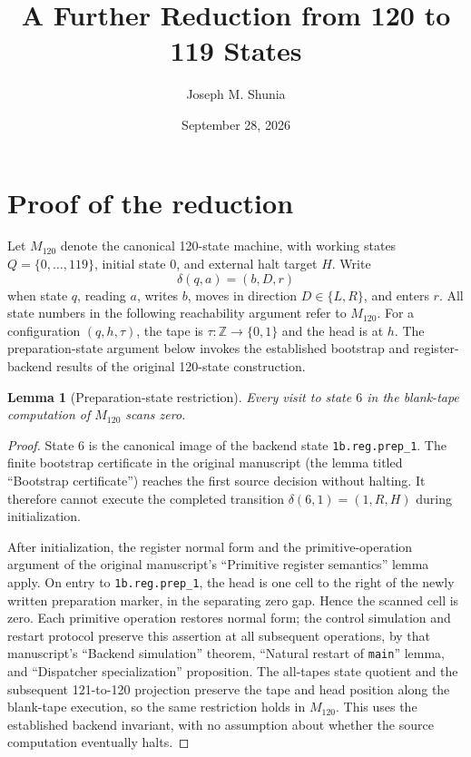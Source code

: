\documentclass[11pt]{article}
\title{A Further Reduction from 120 to 119 States}
\author{Joseph M. Shunia}
\date{September 28, 2026}
\newtheorem{lemma}[theorem]{Lemma}
\begin{document}
\maketitle

\section{Proof of the reduction}
\label{sec:119reduction}

Let $M_{120}$ denote the canonical 120-state machine, with working states
$Q=\{0,\ldots,119\}$, initial state $0$, and external halt target $H$.
Write
\[
  \delta(q,a)=(b,D,r)
\]
when state $q$, reading $a$, writes $b$, moves in direction
$D\in\{L,R\}$, and enters $r$. All state numbers in the following
reachability argument refer to $M_{120}$.
For a configuration $(q,h,\tau)$, the tape is
$\tau\colon\mathbb Z\to\{0,1\}$ and the head is at $h$.
The preparation-state argument below invokes the established bootstrap
and register-backend results of the original 120-state construction.

\begin{lemma}[Preparation-state restriction]
\label{lem:119prep}
Every visit to state $6$ in the blank-tape computation of $M_{120}$
scans zero.
\end{lemma}

\begin{proof}
State $6$ is the canonical image of the backend state
\texttt{1b.reg.prep\_1}. The finite bootstrap certificate
in the original manuscript (the lemma titled ``Bootstrap certificate'')
reaches the first source decision without halting.
It therefore cannot execute the completed transition
$\delta(6,1)=(1,R,H)$ during initialization.

After initialization, the register normal form and the primitive-operation
argument of the original manuscript's ``Primitive register semantics''
lemma apply. On entry to
\texttt{1b.reg.prep\_1}, the head is one cell to the right of the newly
written preparation marker, in the separating zero gap. Hence the scanned
cell is zero. Each primitive operation restores normal form; the control
simulation and restart protocol preserve this assertion at all subsequent
operations, by that manuscript's ``Backend simulation'' theorem,
``Natural restart of \texttt{main}'' lemma, and ``Dispatcher
specialization'' proposition.
The all-tapes state quotient and the subsequent 121-to-120 projection
preserve the tape and head position along the blank-tape execution, so
the same restriction holds in $M_{120}$.
This uses the established backend invariant, with no assumption about
whether the source computation eventually halts.
\end{proof}
\end{document}
